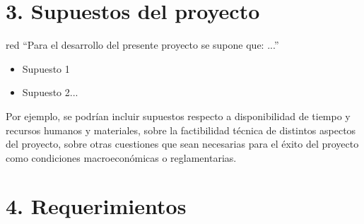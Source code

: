 \documentclass[11pt]{charter}
\begin{document}
\section{3. Supuestos del proyecto}
\label{sec:supuestos}

\begin{consigna}{red}
``Para el desarrollo del presente proyecto se supone que: ...''

\begin{itemize}
\item Supuesto 1
\item Supuesto 2...
\end{itemize}

Por ejemplo, se podrían incluir supuestos respecto a disponibilidad de tiempo y recursos humanos y materiales, sobre la factibilidad técnica de distintos aspectos del proyecto, sobre otras cuestiones que sean necesarias para el éxito del proyecto como condiciones macroeconómicas o reglamentarias.
\end{consigna}

\section{4. Requerimientos}
\label{sec:requerimientos}
\end{document}
